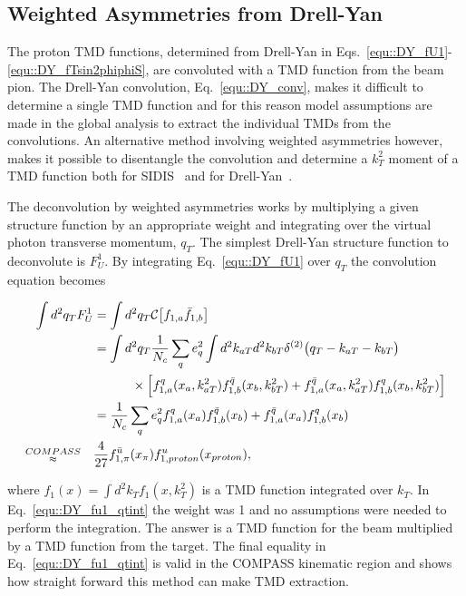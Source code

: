 \subsection{Weighted Asymmetries from Drell-Yan}\label{sec::qt_w_theory}

The proton TMD functions, determined from Drell-Yan in
Eqs.~\ref{equ::DY_fU1}-\ref{equ::DY_fTsin2phiphiS}, are convoluted with a TMD
function from the beam pion.  The Drell-Yan convolution, Eq.~\ref{equ::DY_conv},
makes it difficult to determine a single TMD function and for this reason model
assumptions are made in the global analysis to extract the individual TMDs from
the convolutions.  An alternative method involving weighted asymmetries however,
makes it possible to disentangle the convolution and determine a $k_T^2$ moment
of a TMD function both for
SIDIS~\cite{Kotzinian:1995cz,Kotzinian:1997wt,Boer:1997nt} and for
Drell-Yan~\cite{Efremov:2004tp,Sissakian:2005vd,Sissakian:2005yp,Wang:2017onm}.

The deconvolution by weighted asymmetries works by multiplying a given structure
function by an appropriate weight and integrating over the virtual photon
transverse momentum, $q_T$.  The simplest Drell-Yan structure function to
deconvolute is $F_U^1$.  By integrating Eq.~\ref{equ::DY_fU1} over $q_T$ the
convolution equation becomes

\begin{align}
  \label{equ::DY_fu1_qtint}
  \int d^2{q_T} F_U^1 &=
  \int d^2{q_T} {\cal C}  \big[ f_{1,a} \bar{f}_{1,b} \big]
  \\ \nonumber
  &= \int d^2{q_T} \frac{1}{N_c} \sum_q e_q^2 \int d^2 k_{aT} d^2 k_{bT} 
  \delta^{(2)}\bigl(q_T - k_{aT} - k_{bT} \bigr)
  \\ \nonumber
  & \quad\quad\quad
  \times \Big[ f_{1,a}^q(x_a,k_{aT}^2)f_{1,b}^{\bar{q}}(x_b,k_{bT}^2) +
    f_{1,a}^{\bar{q}}(x_a,k_{aT}^2)f_{1,b}^{q}(x_b,k_{bT}^2) \Big]
  \\ \nonumber
  &= \frac{1}{N_c} \sum_q
  e_q^2 f_{1,a}^q(x_a)f_{1,b}^{\bar{q}}(x_b) +
  f_{1,a}^{\bar{q}}(x_a)f_{1,b}^{q}(x_b)
  \\ \nonumber
   \substack{COMPASS \\ \approx} \quad &
   \frac{4}{27}f_{1,\pi}^{\bar{u}}(x_\pi)f_{1,proton}^u(x_{proton}),
\end{align}

\noindent
where $f_1(x) = \int d^2 k_{T} f_1(x,k_{T}^2)$ is a TMD function integrated over
$k_T$.  In Eq.~\ref{equ::DY_fu1_qtint} the weight was 1 and no assumptions were
needed to perform the integration.  The answer is a TMD function for the beam
multiplied by a TMD function from the target.  The final equality in
Eq.~\ref{equ::DY_fu1_qtint} is valid in the COMPASS kinematic region and shows
how straight forward this method can make TMD extraction.


